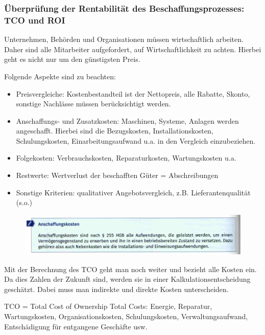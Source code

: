 \documentclass[10pt]{article}
\begin{document}
\subsubsection{Überprüfung der Rentabilität des Beschaffungsprozesses: TCO und ROI}

Unternehmen, Behörden und Organisationen müssen wirtschaftlich arbeiten. Daher sind alle Mitarbeiter aufgefordert, auf Wirtschaftlichkeit zu achten. Hierbei geht es nicht nur um den günstigsten Preis.

Folgende Aspekte sind zu beachten:
\begin{itemize}
	\item Preisvergleiche: Kostenbestandteil ist der Nettopreis, alle Rabatte, Skonto, sonstige Nachlässe müssen berücksichtigt werden.
	\item Anschaffungs- und Zusatzkosten: Maschinen, Systeme, Anlagen werden angeschafft. Hierbei sind die Bezugskosten, Installationskosten, Schulungskosten, Einarbeitungsaufwand u.a. in den Vergleich einzubeziehen.
	\item Folgekosten: Verbrauchskosten, Reparaturkosten, Wartungskosten u.a.
	\item Restwerte: Wertverlust der beschafften Güter = Abschreibungen
	\item Sonstige Kriterien: qualitativer Angebotsvergleich, z.B. Lieferantenqualität (s.o.)
\end{itemize}

\begin{figure}[H]
\begin{center}
  \includegraphics[width=12cm]{Anschaffungskosten.png}
  \end{center}
  \label{fig:Anschaffungskosten.png}
\end{figure} 

Mit der Berechnung des TCO geht man noch weiter und bezieht alle Kosten ein.
Da dies Zahlen der Zukunft sind, werden sie in einer Kalkulationsentscheidung geschätzt. Dabei muss man indirekte und direkte Kosten unterscheiden.

TCO = Total Cost of Ownership
Total Costs: Energie, Reparatur, Wartungskosten, Organisationskosten, Schulungskosten, Verwaltungsaufwand, Entschädigung für entgangene Geschäfte usw.
\end{document}
